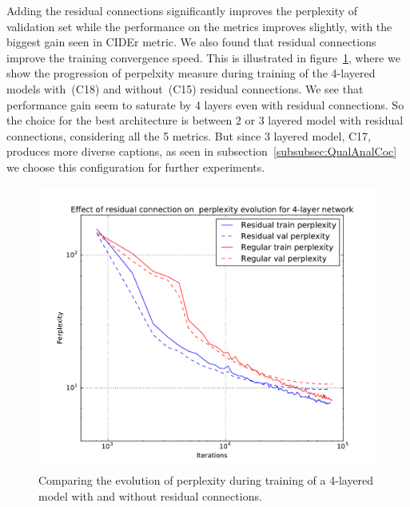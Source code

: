 Adding the residual connections significantly improves the perplexity of
validation set while the performance on the metrics improves slightly, with the
biggest gain seen in CIDEr metric.
We also found that residual connections improve the training convergence speed.
This is illustrated in figure~\ref{fig:MetVsPerplex}, where we show the
progression of perpelxity measure during training of the 4-layered models
with~(C18) and without~(C15) residual connections.
We see that performance gain seem to saturate by 4 layers even with residual
connections.
So the choice for the best architecture is between 2 or 3 layered model with
residual connections, considering all the 5 metrics.
But since 3 layered model, C17, produces more diverse captions, as seen in
subsection~\ref{subsubsec:QualAnalCoc} we choose this configuration for further
experiments.
\begin{figure}[t]
\begin{center}
  \includegraphics[width=0.7\linewidth]{images/ResidualVsRegPerplex.pdf}
\end{center}
\vspace*{-10mm}
\caption{Comparing the evolution of perplexity during training of a 4-layered
        model with and without residual connections.}
\label{fig:MetVsPerplex}
\end{figure}

